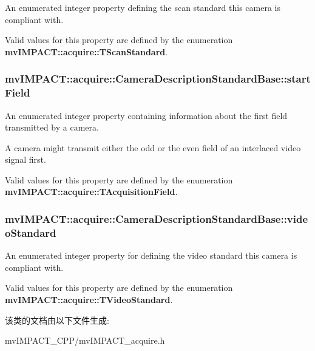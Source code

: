 An enumerated integer property defining the scan standard this camera is compliant with. 

Valid values for this property are defined by the enumeration {\bfseries mv\+I\+M\+P\+A\+C\+T\+::acquire\+::\+T\+Scan\+Standard}. \hypertarget{classmv_i_m_p_a_c_t_1_1acquire_1_1_camera_description_standard_base_acad50fee713c8790dc7c23b64d86a9ac}{
\subsubsection[{start\+Field}]{ mv\+I\+M\+P\+A\+C\+T\+::acquire\+::\+Camera\+Description\+Standard\+Base\+::start\+Field}}\label{classmv_i_m_p_a_c_t_1_1acquire_1_1_camera_description_standard_base_acad50fee713c8790dc7c23b64d86a9ac}


An enumerated integer property containing information about the first field transmitted by a camera. 

A camera might transmit either the odd or the even field of an interlaced video signal first.

Valid values for this property are defined by the enumeration {\bfseries mv\+I\+M\+P\+A\+C\+T\+::acquire\+::\+T\+Acquisition\+Field}. \hypertarget{classmv_i_m_p_a_c_t_1_1acquire_1_1_camera_description_standard_base_a4677d000f2ddaec6e356b6cc48eb50e0}{
\subsubsection[{video\+Standard}]{ mv\+I\+M\+P\+A\+C\+T\+::acquire\+::\+Camera\+Description\+Standard\+Base\+::video\+Standard}}\label{classmv_i_m_p_a_c_t_1_1acquire_1_1_camera_description_standard_base_a4677d000f2ddaec6e356b6cc48eb50e0}


An enumerated integer property for defining the video standard this camera is compliant with. 

Valid values for this property are defined by the enumeration {\bfseries mv\+I\+M\+P\+A\+C\+T\+::acquire\+::\+T\+Video\+Standard}. 

该类的文档由以下文件生成\+:\begin{DoxyCompactItemize}
\item 
mv\+I\+M\+P\+A\+C\+T\+\_\+\+C\+P\+P/mv\+I\+M\+P\+A\+C\+T\+\_\+acquire.\+h\end{DoxyCompactItemize}
